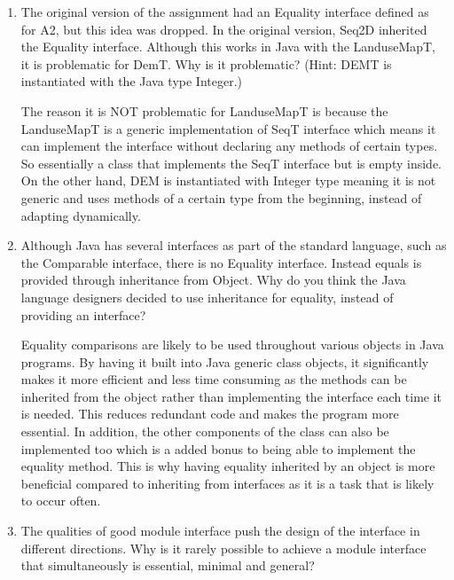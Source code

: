 \documentclass[12pt]{article}
\begin{document}
\begin{enumerate}
\item The original version of the assignment had an Equality interface defined as for A2, but this idea was dropped.  In the original version, Seq2D inherited the Equality interface.  Although this works in Java with the LanduseMapT, it is problematic for DemT.  Why is it problematic?  (Hint: DEMT is instantiated with the Java type Integer.)
  
The reason it is NOT problematic for LanduseMapT is because the LanduseMapT is a generic implementation of SeqT interface which means it can implement the interface without declaring any methods of certain types. So essentially a class that implements the SeqT interface but is empty inside. On the other hand, DEM is instantiated with Integer type meaning it is not generic and uses methods of a certain type from the beginning, instead of adapting dynamically.


\item Although Java has several interfaces as part of the standard language,
  such as the Comparable interface, there is no Equality interface.  Instead
  equals is provided through inheritance from Object.  Why do you think the
  Java language designers decided to use inheritance for equality, instead of
  providing an interface?
  
  Equality comparisons are likely to be used throughout various objects in Java programs. By having it built into Java generic class objects, it significantly makes it more efficient and less time consuming as the methods can be inherited from the object rather than implementing the interface each time it is needed. This reduces redundant code and makes the program more essential. In addition, the other components of the class can also be implemented too which is a added bonus to being able to implement the equality method. This is why having equality inherited by an object is more beneficial compared to inheriting from interfaces as it is a task that is likely to occur often.
  
  
\item The qualities of good module interface push the design of the interface in different directions. Why is it rarely possible to achieve a module interface that simultaneously is essential, minimal and general?
\end{enumerate}
\end{document}
